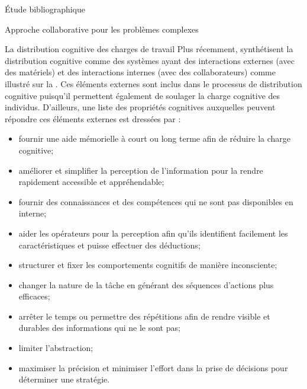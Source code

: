 \documentclass[myfrancais,ngerman,english,frenchb]{mythesis}
\begin{document}
\begin{mychapter}{Étude bibliographique}
\begin{mysection}{Approche collaborative pour les problèmes complexes}
\begin{mysubsection}{La distribution cognitive des charges de travail}
				Plus récemment,  synthétisent la distribution cognitive comme des systèmes ayant des interactions externes (avec des matériels)  et des interactions internes (avec des collaborateurs) comme illustré sur la .
				Ces éléments externes sont inclus dans le processus de distribution cognitive puisqu'il permettent également de soulager la charge cognitive des individus.
				D'ailleurs, une liste des propriétés cognitives auxquelles peuvent répondre ces éléments externes est dressées par  :
				\begin{itemize}
					\item fournir une aide mémorielle à court ou long terme afin de réduire la charge cognitive;
					\item améliorer et simplifier la perception de l'information pour la rendre rapidement accessible et appréhendable;
					\item fournir des connaissances et des compétences qui ne sont pas disponibles en interne;
					\item aider les opérateurs pour la perception afin qu'ils identifient facilement les caractéristiques et puisse effectuer des déductions;
					\item structurer et fixer les comportements cognitifs de manière inconsciente;
					\item changer la nature de la tâche en générant des séquences d'actions plus efficaces;
					\item arrêter le temps ou permettre des répétitions afin de rendre visible et durables des informations qui ne le sont pas;
					\item limiter l'abstraction;
					\item maximiser la précision et minimiser l'effort dans la prise de décisions pour déterminer une stratégie.
				\end{itemize}


\end{mysubsection}
\end{mysection}
\end{mychapter}
\end{document}
